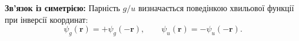 %
%
%
%
%
%
%
%
%

\textbf{Зв’язок із симетрією:}
Парність $g/u$ визначається поведінкою хвильової функції при інверсії координат:
\[
\psi_g(\mathbf{r}) = +\psi_g(-\mathbf{r}), \qquad
\psi_u(\mathbf{r}) = -\psi_u(-\mathbf{r}).
\]

